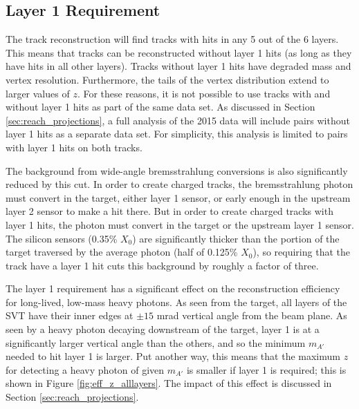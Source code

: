 \subsection{Layer 1 Requirement}
\label{sec:layer1_cut}
The track reconstruction will find tracks with hits in any 5 out of the 6 layers.
This means that tracks can be reconstructed without layer 1 hits (as long as they have hits in all other layers).
Tracks without layer 1 hits have degraded mass and vertex resolution.
Furthermore, the tails of the vertex distribution extend to larger values of $z$.
For these reasons, it is not possible to use tracks with and without layer 1 hits as part of the same data set.
As discussed in Section \ref{sec:reach_projections}, a full analysis of the 2015 data will include pairs without layer 1 hits as a separate data set.
For simplicity, this analysis is limited to pairs with layer 1 hits on both tracks.

The background from wide-angle bremsstrahlung conversions is also significantly reduced by this cut.
In order to create charged tracks, the bremsstrahlung photon must convert in the target, either layer 1 sensor, or early enough in the upstream layer 2 sensor to make a hit there.
But in order to create charged tracks with layer 1 hits, the photon must convert in the target or the upstream layer 1 sensor.
The silicon sensors (0.35\% $X_0$) are significantly thicker than the portion of the target traversed by the average photon (half of 0.125\% $X_0$), so requiring that the track have a layer 1 hit cuts this background by roughly a factor of three.

The layer 1 requirement has a significant effect on the reconstruction efficiency for long-lived, low-mass heavy photons.
As seen from the target, all layers of the SVT have their inner edges at $\pm 15$ mrad vertical angle from the beam plane.
As seen by a heavy photon decaying downstream of the target, layer 1 is at a significantly larger vertical angle than the others, and so the minimum $m_{A'}$ needed to hit layer 1 is larger.
Put another way, this means that the maximum $z$ for detecting a heavy photon of given $m_{A'}$ is smaller if layer 1 is required; this is shown in Figure \ref{fig:eff_z_alllayers}.
The impact of this effect is discussed in Section \ref{sec:reach_projections}.


